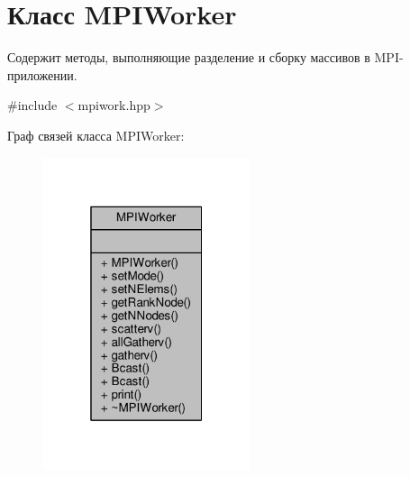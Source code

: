\hypertarget{classMPIWorker}{\section{Класс M\-P\-I\-Worker}
\label{classMPIWorker}
}


Содержит методы, выполняющие разделение и сборку массивов в M\-P\-I-\/приложении.  




{\ttfamily \#include $<$mpiwork.\-hpp$>$}



Граф связей класса M\-P\-I\-Worker\-:
\nopagebreak
\begin{figure}[H]
\begin{center}
\leavevmode
\includegraphics[width=172pt]{classMPIWorker__coll__graph}
\end{center}
\end{figure}
